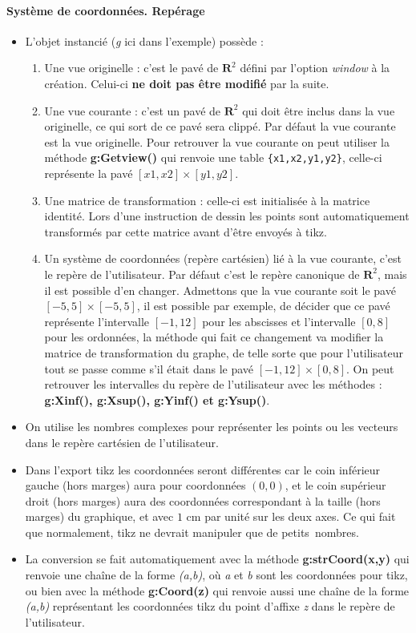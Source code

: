 \documentclass[%
10pt,%
a4paper,%
french,%
]%
{article}%
\begin{document}
\paragraph{Système de coordonnées. Repérage}

\begin{itemize}
\item L'objet instancié (\emph{g} ici dans l'exemple) possède :
    \begin{enumerate}
        \item Une vue originelle : c'est le pavé de $\mathbf R^2$ défini par l'option \emph{window} à la création. Celui-ci \textbf{ne doit pas être modifié} par la suite.
        \item Une vue courante : c'est un pavé de $\mathbf R^2$ qui doit être inclus dans la vue originelle, ce qui sort de ce pavé sera clippé. Par défaut la vue courante est la vue originelle. Pour retrouver la vue courante on peut utiliser la méthode \textbf{g:Getview()} qui renvoie une table \verb|{x1,x2,y1,y2}|, celle-ci représente la pavé $[x1,x2]\times [y1,y2]$.
        \item Une matrice de transformation : celle-ci est initialisée à la matrice identité. Lors d'une instruction de dessin les points sont automatiquement transformés par cette matrice avant d'être envoyés à tikz.
        \item Un système de coordonnées (repère cartésien) lié à la vue courante, c'est le repère de l'utilisateur. Par défaut c'est le repère canonique de $\mathbf R^2$, mais il est possible d'en changer. Admettons que la vue courante soit le pavé $[-5,5]\times[-5,5]$, il est possible par exemple, de décider que ce pavé représente l'intervalle $[-1,12]$ pour les abscisses et l'intervalle $[0,8]$ pour les ordonnées, la méthode qui fait ce changement va modifier la matrice de transformation du graphe, de telle sorte que pour l'utilisateur tout se passe comme s'il était dans le pavé $[-1,12]\times [0,8]$. On peut retrouver les intervalles du repère de l'utilisateur avec les méthodes : \textbf{g:Xinf(), g:Xsup(), g:Yinf() et g:Ysup()}.
    \end{enumerate}
\item On utilise les nombres complexes pour représenter les points ou les vecteurs dans le repère cartésien de l'utilisateur.
\item Dans l'export tikz les coordonnées seront différentes car le coin inférieur gauche (hors marges) aura pour coordonnées $(0,0)$, et le coin supérieur droit (hors marges) aura des coordonnées correspondant à la taille (hors marges) du graphique, et avec $1$ cm par unité sur les deux axes. Ce qui fait que normalement, tikz ne devrait manipuler que de \og petits\fg\ nombres.
\item La conversion se fait automatiquement avec la méthode \textbf{g:strCoord(x,y)} qui renvoie une chaîne de la forme \emph{(a,b)}, où \emph{a} et \emph{b} sont les coordonnées pour tikz, ou bien avec la méthode \textbf{g:Coord(z)} qui renvoie aussi une chaîne de la forme \emph{(a,b)} représentant les coordonnées tikz du point d'affixe \emph{z} dans le repère de l'utilisateur.
\end{itemize}
\end{document}
